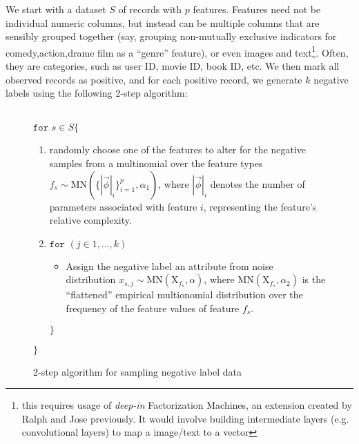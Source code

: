 \documentclass{article}
\begin{document}
We start with a dataset $S$ of records with $p$ features. Features need not be individual numeric columns, but instead can be multiple columns that are sensibly grouped together (say, grouping non-mutually exclusive indicators for comedy,action,drame film as a ``genre'' feature), or even images and text\footnote{this requires usage of \textit{deep-in} Factorization Machines, an extension created by Ralph and Jose previously. It would involve building intermediate layers (e.g. convolutional layers) to map a image/text to a vector}. Often, they are categories, such as user ID, movie ID, book ID, etc. We then mark all observed records as positive, and for each positive record, we generate $k$ negative labels using the following 2-step algorithm:
\\ \\
\begin{figure}
\begin{tcolorbox}
\noindent$\texttt{for }  s \in S \{$
\begin{enumerate}
	\item randomly choose  one of the features to alter for the negative samples from a multinomial over the feature types
	$ f_s \sim \text{MN}(\{|\vec{\phi}|_i\}_{i=1}^p,\alpha_1) $, where $|\vec{\phi}|_i$ denotes the number of parameters associated with feature $i$, representing the feature's relative complexity.
	\item $\texttt{for } (j \in 1,\ldots,k)$
	\begin{itemize}
		\item Assign the negative label an attribute from noise distribution $x_{s,j} \sim \text{MN}(\mathrm{X}_{f_s},\alpha)$, where $\text{MN}(\mathrm{X}_{f_s},\alpha_2)$ is the ``flattened'' empirical multionomial distribution over the frequency of the feature values of feature $f_s$.
	\end{itemize}
	$\}$
\end{enumerate}
$\}$
\end{tcolorbox}
\caption{2-step algorithm for sampling negative label data}
\end{figure}
\end{document}
